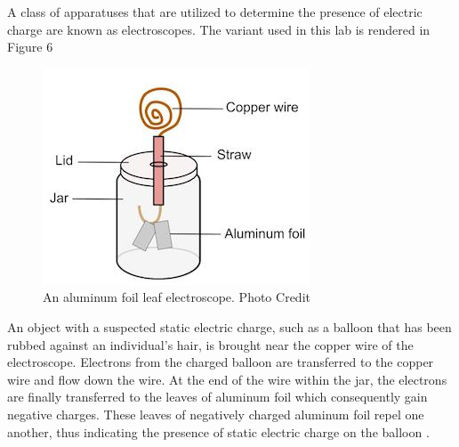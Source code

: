 \documentclass[12pt]{amsart}
\begin{document}
\indent A class of  apparatuses that are utilized to determine the presence of electric charge are known as electroscopes. The variant used in this lab is rendered in Figure 6\\
\begin{figure}[h]
	\includegraphics[width=\smallgraph,scale=0.01]{leaf.png}
	\caption{An aluminum foil leaf electroscope. Photo Credit \cite{Ele}}
	\label{leaf}
\end{figure} 

\indent An object with a suspected static electric charge, such as a balloon that has been rubbed against an individual’s hair, is brought near the copper wire of the electroscope. Electrons from the charged balloon are transferred to the copper wire and flow down the wire. At the end of the wire within the jar, the electrons are finally transferred to the leaves of aluminum foil which consequently gain negative charges. These leaves of negatively charged aluminum foil repel one another, thus indicating the presence of static electric charge on the balloon \cite{Champ}. \\
\end{document}
